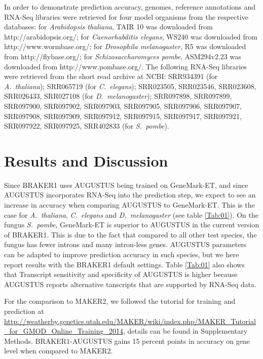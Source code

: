 \documentclass{bioinfo}
\begin{document}
\begin{methods}
In order to demonstrate prediction accuracy, genomes, reference annotations and RNA-Seq libraries were retrieved for four model organisms from the respective databases: for \textit{Arabidopsis thaliana}, TAIR 10 was downloaded from http://arabidopsis.org/; for \textit{Caenorhabditis elegans}, WS240 was downloaded from http://www.wormbase.org/; for \textit{Drosophila melanogaster}, R5 was downloaded from http://flybase.org/; for \textit{Schizosaccharomyces pombe}, ASM294v2.23 was downloaded from http://www.pombase.org/. The following RNA-Seq libraries were retrieved from the short read archive at NCBI: SRR934391 (for \textit{A.~thaliana}); SRR065719 (for \textit{C.~elegans}); SRR023505, SRR023546, SRR023608, SRR026433, SRR027108 (for \textit{D.~melanogaster}); SRR097898, SRR097899, SRR097900, SRR097902, SRR097903,
SRR097905, SRR097906, SRR097907, SRR097908, SRR097909,
SRR097912, SRR097915, SRR097917, SRR097921, SRR097922,
SRR097925, SRR402833 (for \textit{S.~pombe}).



\end{methods}


\section{Results and Discussion}

Since BRAKER1 uses AUGUSTUS being trained on GeneMark-ET, and since AUGUSTUS incorporates RNA-Seq into the prediction step, we expect to see an increase in accuracy when comparing AUGUSTUS to GeneMark-ET. This is the case for \textit{A.~thaliana}, \textit{C.~elegans} and \textit{D.~melanogaster} (see table \ref{Tab:01}). On the fungus \textit{S.~pombe}, GeneMark-ET is superior to AUGUSTUS in the current version of BRAKER1. This is due to the fact that compared to all other test species, the fungus has fewer introns and many intron-less genes. AUGUSTUS parameters can be adapted to improve prediction accuracy in such species, but we here report results with the BRAKER1 default settings. Table \ref{Tab:01} also shows that Transcript sensitivity and specificity of AUGUSTUS is higher because AUGUSTUS reports alternative tanscripts that are supported by RNA-Seq data. 

For the comparison to MAKER2, we followed the tutorial for training and prediction at 
\url{http://weatherby.genetics.utah.edu/MAKER/wiki/index.php/MAKER_Tutorial_for_GMOD_Online_Training_2014}, details can be found in Supplementary Methods. BRAKER1-AUGUSTUS gains 15 percent points in accuracy on gene level when compared to MAKER2. 
\end{document}
